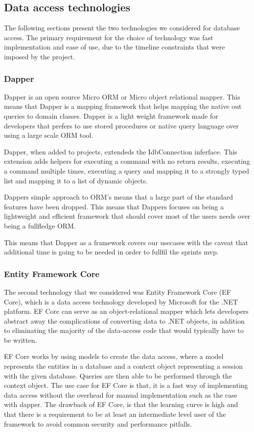 \subsection{Data access technologies}
The following sections present the two technologies we considered for database access.
The primary requirement for the choice of technology was fast implementation and ease of use, due to the timeline constraints that were imposed by the \knox{} project. 

\subsubsection{Dapper}
Dapper is an open source Micro ORM or Micro object relational mapper. This means that Dapper is a mapping framework that helps mapping the native out queries to domain classes. Dapper is a light weight framework made for developers that prefers to use stored procedures or native query language over using a large scale ORM tool. 

Dapper, when added to projects, extendeds the IdbConnection inferface. This extension adds helpers for executing a command with no return results, executing a command multiple times, executing a query and mapping it to a strongly typed list and mapping it to a list of dynamic objects. \cite{Dapper_Git}

Dappers simple approach to ORM's means that a large part of the standard features have been dropped. This means that Dappers focuses on being a lightweight and efficient framework that should cover most of the users needs over being a fullfledge ORM.\cite{Dapper_Git} 

This means that Dapper as a framework covers our usecases with the caveat that additional time is going to be needed in order to fullfil the sprints mvp. 

\subsubsection{Entity Framework Core}
The second technology that we considered was Entity Framework Core (EF Core), which is a data access technology developed by Microsoft for the .NET platform. EF Core can serve as an object-relational mapper \cite{Object_relational_mapping} which lets developers abstract away the complications of converting data to .NET objects, in addition to eliminating the majority of the data-access code that would typically have to be written.

EF Core works by using models to create the data access, where a model represents the entities in a database and a context object representing a session with the given database. Queries are then able to be performed through the context object. 
The use case for EF Core is that, it is a fast way of implementing data access without the overhead for manual implementation such as the case with dapper. 
The drawback of EF Core, is that the learning curve is high and that there is a requirement to be at least an intermediate level user of the framework to avoid common security and performance pitfalls. \cite{EFCore}

